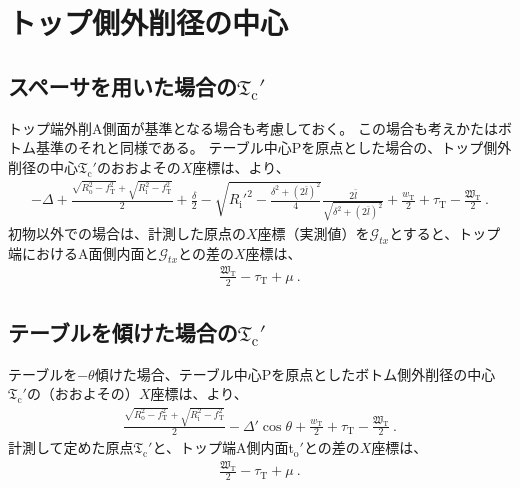 \clearpage
\section{トップ側外削径の中心}


\subsection[スペーサを用いた場合の\texorpdfstring{$\mathfrak T_\mathrm c'$}{Tc'}]
           {スペーサを用いた場合の$\boldsymbol{\mathfrak T_\mathrm c'}$}
トップ端外削A側面が基準となる場合も考慮しておく。
この場合も考えかたはボトム基準のそれと同様である。
テーブル中心Pを原点とした場合の、トップ側外削径の中心$\mathfrak T_\mathrm c'$のおおよその$X$座標は、より、
\begin{align*}
  -\varDelta+\frac{\sqrt{R_\mathrm o^2-f_\mathrm T^2}+\sqrt{R_\mathrm i^2-f_\mathrm T^2}}2+\frac\delta2
  -\sqrt{R_\mathrm i'^2-\frac{\delta^2+(2\bar l)^2}4}\frac{2\bar l}{\sqrt{\delta^2+(2\bar l)^2}}
  +\frac{w_\mathrm T}2+\tau_\mathrm T-\frac{\mathfrak W_\mathrm T}2\ .
\end{align*}
初物以外での場合は、計測した原点の$X$座標（実測値）を$\mathcal G_{tx}$とすると、トップ端におけるA面側内面と$\mathcal G_{tx}$との差の$X$座標は、
\begin{align*}
  \frac{\mathfrak W_\mathrm T}2-\tau_\mathrm T+\mu~.
\end{align*}


\subsection[テーブルを傾けた場合の\texorpdfstring{$\mathfrak T_\mathrm c'$}{Tc'}]
           {テーブルを傾けた場合の$\boldsymbol{\mathfrak T_\mathrm c'}$}
テーブルを$-\theta$傾けた場合、テーブル中心Pを原点としたボトム側外削径の中心$\mathfrak T_\mathrm c'$の（おおよその）$X$座標は、より、
\begin{align*}
  \frac{\sqrt{R_\mathrm o^2-f_\mathrm T^2}+\sqrt{R_\mathrm i^2-f_\mathrm T^2}}2-\varDelta'\cos\theta
  +\frac{w_\mathrm T}2+\tau_\mathrm T-\frac{\mathfrak W_\mathrm T}2\ .
\end{align*}
計測して定めた原点$\mathfrak T_\mathrm c'$と、トップ端A側内面t$_\mathrm o'$との差の$X$座標は、
\begin{align*}
  \frac{\mathfrak W_\mathrm T}2-\tau_\mathrm T+\mu~.
\end{align*}




